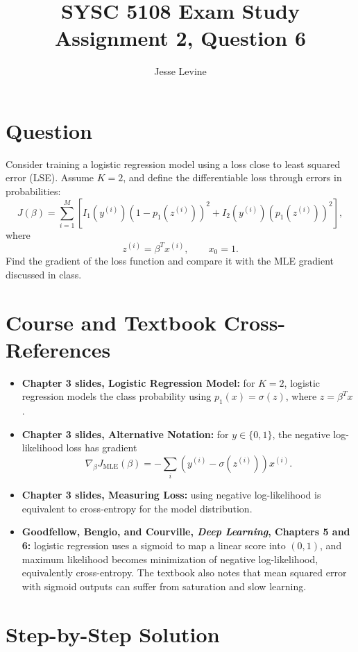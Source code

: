 \documentclass[11pt]{article}
\title{SYSC 5108 Exam Study\\Assignment 2, Question 6}
\author{Jesse Levine}
\date{}
\begin{document}
\maketitle

\section*{Question}

Consider training a logistic regression model using a loss close to least squared
error (LSE). Assume \(K=2\), and define the differentiable loss through errors in
probabilities:
\[
    J(\beta)
    =
    \sum_{i=1}^{M}
    \left[
        I_1(y^{(i)})\left(1-p_1(z^{(i)})\right)^2
        +
        I_2(y^{(i)})\left(p_1(z^{(i)})\right)^2
    \right],
\]
where
\[
    z^{(i)} = \beta^T x^{(i)}, \qquad x_0=1.
\]
Find the gradient of the loss function and compare it with the MLE gradient
discussed in class.

\section*{Course and Textbook Cross-References}

\begin{itemize}
    \item \textbf{Chapter 3 slides, Logistic Regression Model:} for \(K=2\),
    logistic regression models the class probability using
    \(p_1(x)=\sigma(z)\), where \(z=\beta^T x\).
    \item \textbf{Chapter 3 slides, Alternative Notation:} for \(y\in\{0,1\}\),
    the negative log-likelihood loss has gradient
    \[
        \nabla_\beta J_{\text{MLE}}(\beta)
        =
        -\sum_i \left(y^{(i)}-\sigma(z^{(i)})\right)x^{(i)}.
    \]
    \item \textbf{Chapter 3 slides, Measuring Loss:} using negative
    log-likelihood is equivalent to cross-entropy for the model distribution.
    \item \textbf{Goodfellow, Bengio, and Courville, \emph{Deep Learning},
    Chapters 5 and 6:} logistic regression uses a sigmoid to map a linear score
    into \((0,1)\), and maximum likelihood becomes minimization of negative
    log-likelihood, equivalently cross-entropy. The textbook also notes that
    mean squared error with sigmoid outputs can suffer from saturation and slow
    learning.
\end{itemize}

\section*{Step-by-Step Solution}
\end{document}
